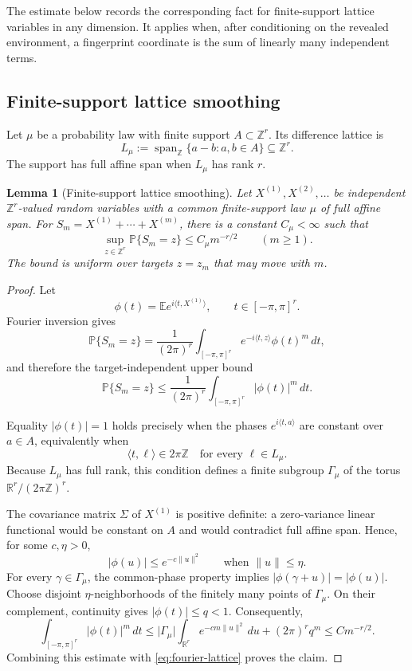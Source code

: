 \documentclass[9pt,twoside]{pnas-new}
\newtheorem{lemma}[theorem]{Lemma}
\theoremstyle{definition}
\theoremstyle{remark}
\renewcommand{\Pr}{\mathbb{P}}
\begin{document}
The estimate below records the corresponding fact for finite-support lattice variables in any dimension. It applies when, after conditioning on the revealed environment, a fingerprint coordinate is the sum of linearly many independent terms.

\subsection{Finite-support lattice smoothing}
Let $\mu$ be a probability law with finite support $A\subset\mathbb Z^r$. Its difference lattice is
\[
 L_\mu:=\operatorname{span}_{\mathbb Z}\{a-b:a,b\in A\}\subseteq\mathbb Z^r.
\]
The support has full affine span when $L_\mu$ has rank $r$.

\begin{lemma}[Finite-support lattice smoothing]
\label{lem:lattice-smoothing}
Let $X^{(1)},X^{(2)},\ldots$ be independent $\mathbb Z^r$-valued random variables with a common finite-support law $\mu$ of full affine span. For $S_m=X^{(1)}+\cdots+X^{(m)}$, there is a constant $C_\mu<\infty$ such that
\[
 \sup_{z\in\mathbb Z^r}\Pr\{S_m=z\}\le C_\mu m^{-r/2}
 \qquad(m\ge1).
\]
The bound is uniform over targets $z=z_m$ that may move with $m$.
\end{lemma}

\begin{proof}
Let
\[
 \phi(t)=\mathbb E e^{i\langle t,X^{(1)}\rangle},
 \qquad t\in[-\pi,\pi]^r.
\]
Fourier inversion gives
\begin{equation}
 \Pr\{S_m=z\}
 =\frac1{(2\pi)^r}\int_{[-\pi,\pi]^r}
 e^{-i\langle t,z\rangle}\phi(t)^m\,dt,
 \label{eq:fourier-lattice}
\end{equation}
and therefore the target-independent upper bound
\[
 \Pr\{S_m=z\}\le\frac1{(2\pi)^r}
 \int_{[-\pi,\pi]^r}\lvert\phi(t)\rvert^m\,dt.
\]

Equality $\lvert\phi(t)\rvert=1$ holds precisely when the phases $e^{i\langle t,a\rangle}$ are constant over $a\in A$, equivalently when
\[
 \langle t,\ell\rangle\in2\pi\mathbb Z
 \quad\text{for every }\ell\in L_\mu.
\]
Because $L_\mu$ has full rank, this condition defines a finite subgroup $\Gamma_\mu$ of the torus $\mathbb R^r/(2\pi\mathbb Z)^r$.

The covariance matrix $\Sigma$ of $X^{(1)}$ is positive definite: a zero-variance linear functional would be constant on $A$ and would contradict full affine span. Hence, for some $c,\eta>0$,
\[
 \lvert\phi(u)\rvert\le e^{-c\lVert u\rVert^2}
 \qquad\text{when }\lVert u\rVert\le\eta.
\]
For every $\gamma\in\Gamma_\mu$, the common-phase property implies
$\lvert\phi(\gamma+u)\rvert=\lvert\phi(u)\rvert$. Choose disjoint $\eta$-neighborhoods of the finitely many points of $\Gamma_\mu$. On their complement, continuity gives $\lvert\phi(t)\rvert\le q<1$. Consequently,
\[
 \int_{[-\pi,\pi]^r}\lvert\phi(t)\rvert^m\,dt
 \le
 \lvert\Gamma_\mu\rvert
 \int_{\mathbb R^r}e^{-cm\lVert u\rVert^2}\,du
 +(2\pi)^rq^m
 \le C m^{-r/2}.
\]
Combining this estimate with \eqref{eq:fourier-lattice} proves the claim.
\end{proof}
\end{document}
